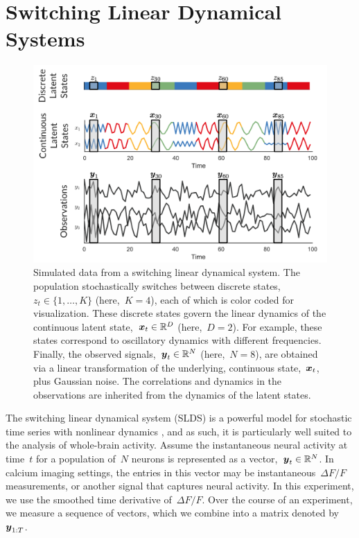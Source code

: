 \documentclass{article}
\begin{document}
\section{Switching Linear Dynamical Systems}
\label{sec:slds}

\begin{figure}[t]
\centering%
\includegraphics[width=5.5in]{slds.png} 
\caption{Simulated data from a switching linear dynamical system.  The
  population stochastically switches between discrete states,~$z_t \in
  \{1,\ldots,K\}$ (here,~$K=4$), each of which is color coded for
  visualization.  These discrete states govern the linear dynamics of
  the continuous latent state,~$\boldsymbol{x}_t \in \mathbb{R}^D$ (here,~$D=2$). For
  example, these states correspond to oscillatory dynamics with
  different frequencies. Finally, the observed signals,~$\boldsymbol{y}_t \in
  \mathbb{R}^N$ (here,~$N=8$), are obtained via a linear transformation of
  the underlying, continuous state,~$\boldsymbol{x}_t$, plus Gaussian noise. The
  correlations and dynamics in the observations are inherited from the
  dynamics of the latent states.}
\label{fig:slds_ex}
\end{figure}

The switching linear dynamical system (SLDS) is a powerful model for
stochastic time series with nonlinear dynamics \citep{ackerson1970state, chang1978state,
  hamilton1990analysis, bar1993estimation, ghahramani1996switching,
  murphy1998switching, fox2009nonparametric}, and as such, it is
particularly well suited to the analysis of whole-brain activity.
Assume the instantaneous neural activity at time~$t$ for a population
of~$N$ neurons is represented as a vector,~$\boldsymbol{y}_t \in \mathbb{R}^N$. In
calcium imaging settings, the entries in this vector may be
instantaneous~$\Delta F/F$ measurements, or another signal that captures
neural activity. In this experiment, we use the smoothed time
derivative of~$\Delta F/F$. Over the course of an experiment, we
measure a sequence of vectors, which we combine into a matrix denoted
by~$\boldsymbol{y}_{1:T}$.
\end{document}
